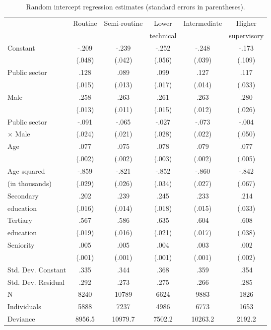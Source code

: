 \documentclass[a4paper,11pt,titlepage]{article}
\begin{document}
\begin{table}[tb]
    \caption{Random intercept regression estimates (standard errors in parentheses).\label{tab:full}}
    \begin{tabularx}{\textwidth}{Yccccc}
    \toprule
                    &Routine    &Semi-routine &Lower &Intermediate    &Higher \\
                    &           &             &technical&           &supervisory \\
    \midrule
    Constant		&-.209     	&-.239		&-.252	&-.248	&-.173\\
    				&(.048)	    &(.042)	    &(.056)	&(.039)	&(.109)\\
    Public sector	&.128		&.089		&.099	&.127	&.117\\
    				&(.015)	    &(.013)	    &(.017)	&(.014)	&(.033)\\
    Male			&.258	    &.263	    &.261	&.263	&.280\\
    				&(.013)	    &(.011)	    &(.015)	&(.012)	&(.026)\\
    Public sector   &-.091	    &-.065	    &-.027	&-.073	&-.004\\
    \quad $\times	$ Male%
    				&(.024)	    &(.021)	    &(.028)	&(.022) &(.050)\\
    Age				&.077	    &.075    	&.078	&.079	&.077\\
    				&(.002)	    &(.002)	    &(.003)	&(.002)	&(.005)\\
    Age squared		&-.859	    &-.821	    &-.852	&-.860	&-.842\\
    \quad (in thousands)%
    				&(.029)	    &(.026)	    &(.034)	&(.027) &(.067)\\
    Secondary 		&.202	    &.239     	&.245	&.233	&.214\\
    \quad education &(.016)     &(.014)	    &(.018)	&(.015)	&(.033)\\
    Tertiary		&.567	    &.586		&.635	&.604	&.608\\
    \quad education &(.019)     &(.016)	    &(.021)	&(.017)	&(.038)\\
    Seniority		&.005	    &.005		&.004	&.003	&.002\\
    				&(.001)	    &(.001)	    &(.001)	&(.001)	&(.002)\\
    \midrule
    Std. Dev. Constant&	.335    &.344       &.368	&.359	&.354\\
    Std. Dev. Residual&	.292    &.273       &.275	&.266	&.285\\
    N			    &8240       &10789      &6624	&9883	&1826\\
    Individuals		&5888       &7237       &4986	&6773	&1653\\
    Deviance		&8956.5     &10979.7    &7502.2 &10263.2&2192.2\\
    \bottomrule
    \end{tabularx}
\end{table}
\end{document}
